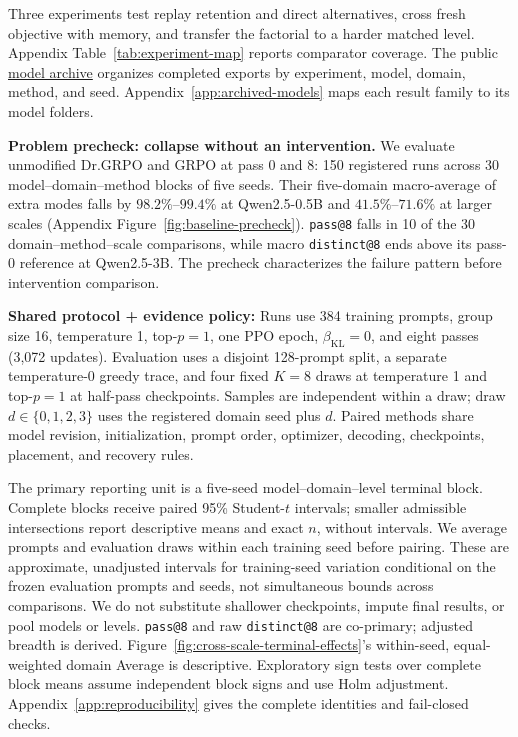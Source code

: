 \documentclass{article}
\newcommand{\1}{\mathbf 1}
\theoremstyle{remark}
\theoremstyle{definition}
\theoremstyle{plain}
\begin{document}
Three experiments test replay retention and direct alternatives, cross
fresh objective with memory, and transfer the factorial to a harder matched
level. Appendix Table~\ref{tab:experiment-map} reports comparator coverage.
The public \href{https://huggingface.co/od2961/maxent-grpo-models}{model archive}
organizes completed exports by experiment, model, domain, method, and seed.
Appendix~\ref{app:archived-models} maps each result family to its model folders.

\noindent\textbf{Problem precheck: collapse without an intervention.}
We evaluate unmodified Dr.GRPO and GRPO at pass 0 and 8: 150
registered runs across 30 model--domain--method blocks of five seeds. Their
five-domain macro-average of extra modes falls by \(98.2\%\)--\(99.4\%\)
at Qwen2.5-0.5B and \(41.5\%\)--\(71.6\%\) at larger scales
(Appendix Figure~\ref{fig:baseline-precheck}). \texttt{pass@8} falls in 10 of
the 30 domain--method--scale comparisons, while macro \texttt{distinct@8} ends
above its pass-0 reference at Qwen2.5-3B. The
precheck characterizes the failure pattern before intervention comparison.


\label{sec:shared-protocol}
\noindent\textbf{Shared protocol + evidence policy:} Runs use 384 training
prompts, group size 16, temperature 1, top-\(p=1\), one PPO epoch,
\(\beta_{\mathrm{KL}}=0\), and eight passes (3,072 updates). Evaluation uses a
disjoint 128-prompt split, a separate temperature-0 greedy trace, and four
fixed \(K=8\) draws at temperature 1 and top-\(p=1\) at half-pass checkpoints.
Samples are independent within a draw; draw \(d\in\{0,1,2,3\}\) uses the
registered domain seed plus \(d\). Paired methods share model revision,
initialization, prompt order, optimizer, decoding, checkpoints, placement, and
recovery rules.

The primary reporting unit is a five-seed model--domain--level terminal block.
Complete blocks receive paired 95\% Student-\(t\) intervals; smaller admissible
intersections report descriptive means and exact \(n\), without intervals.
We average prompts and evaluation draws within each training seed before
pairing. These are approximate, unadjusted intervals for training-seed
variation conditional on the frozen evaluation prompts and seeds, not
simultaneous bounds across comparisons. We do not substitute
shallower checkpoints, impute final results, or pool models or levels.
\texttt{pass@8} and raw \texttt{distinct@8} are co-primary; adjusted breadth is
derived. Figure~\ref{fig:cross-scale-terminal-effects}'s within-seed, equal-weighted
domain Average is descriptive. Exploratory sign tests over complete block
means assume independent block signs and use Holm adjustment.
Appendix~\ref{app:reproducibility} gives the complete identities and fail-closed
checks.
\end{document}
